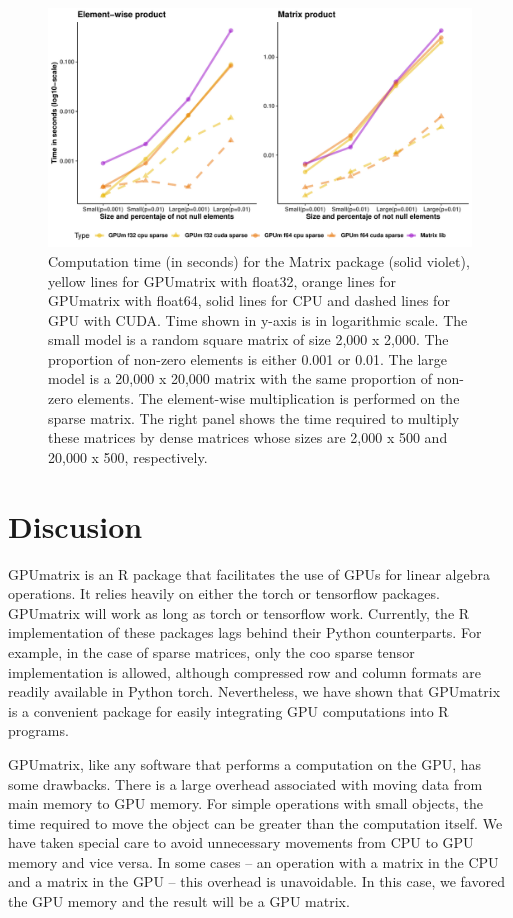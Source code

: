 \begin{figure}
\includegraphics[width=1\linewidth,height=0.3\textheight]{figures/SparsePerformanceComparison} \caption{Computation time (in seconds) for the Matrix package (solid violet), yellow lines for GPUmatrix with float32, orange lines for GPUmatrix with float64, solid lines for CPU and dashed lines for GPU with CUDA. Time shown in y-axis is in logarithmic scale. The small model is a random square matrix of size 2,000 x 2,000. The proportion of non-zero elements is either 0.001 or 0.01. The large model is a 20,000 x 20,000 matrix with the same proportion of non-zero elements. The element-wise multiplication is performed on the sparse matrix. The right panel shows the time required to multiply these matrices by dense matrices whose sizes are 2,000 x 500 and 20,000 x 500, respectively.}\label{fig:SparseFunctionTime}
\end{figure}

\hypertarget{discusion}{%
\section{Discusion}\label{discusion}}

GPUmatrix is an R package that facilitates the use of GPUs for linear algebra operations. It relies heavily on either the torch or tensorflow packages. GPUmatrix will work as long as torch or tensorflow work. Currently, the R implementation of these packages lags behind their Python counterparts. For example, in the case of sparse matrices, only the coo sparse tensor implementation is allowed, although compressed row and column formats are readily available in Python torch. Nevertheless, we have shown that GPUmatrix is a convenient package for easily integrating GPU computations into R programs.

GPUmatrix, like any software that performs a computation on the GPU, has some drawbacks. There is a large overhead associated with moving data from main memory to GPU memory. For simple operations with small objects, the time required to move the object can be greater than the computation itself. We have taken special care to avoid unnecessary movements from CPU to GPU memory and vice versa. In some cases -- an operation with a matrix in the CPU and a matrix in the GPU -- this overhead is unavoidable. In this case, we favored the GPU memory and the result will be a GPU matrix.

